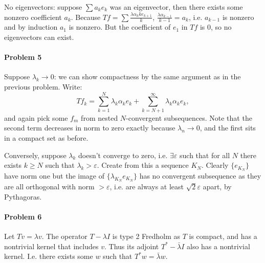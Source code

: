 \documentclass[12pt]{article}
\begin{document}
No eigenvectors: suppose $\sum a_ke_k$ was an eigenvector, then there exists
some nonzero coefficient $a_k$. Because $Tf = \sum \frac{\lambda \alpha_{k}{k}
  e_{k+1}}{k}$, $\frac{\lambda\alpha_{k-1}}{k-1} = a_k$, i.e. $a_{k-1}$ is
nonzero and by induction $a_1$ is nonzero. But the coefficient of $e_1$ in $Tf$
is 0, so no eigenvectors can exist.

\paragraph{Problem 5}

Suppose $\lambda_k \to 0$: we can show compactness by the same argument as in
the previous problem. Write:
\begin{displaymath}
  Tf_k = \sum_{k=1}^N\lambda_k\alpha_ke_k + \sum_{k=N+1}^\infty\lambda_k\alpha_ke_k,
\end{displaymath}
and again pick some $f_m$ from nested $N$-convergent subsequences. Note that
the second term decreases in norm to zero exactly because $\lambda_n\to 0$, and
the first sits in a compact set as before.

Conversely, suppose $\lambda_k$ doesn't converge to zero, i.e. $\exists
\varepsilon$ such that for all $N$ there exists $k \geq N$ such that $\lambda_k
> \varepsilon$. Create from this a sequence $K_N$. Clearly $\{e_{K_N}\}$ have
norm one but the image of $\{\lambda_{K_N}e_{K_N}\}$ has no convergent
subsequence
as they are all orthogonal with norm $> \varepsilon$, i.e. are always at least
$\sqrt{2}\varepsilon$ apart, by Pythagoras.

\paragraph{Problem 6}

Let $Tv = \lambda v$. The operator $T-\lambda I$ is type 2 Fredholm as $T$ is
compact, and has a nontrivial kernel that includes $v$. Thus its adjoint
$T^* - \bar{\lambda}I$ also has a nontrivial kernel. I.e. there exists some
$w$ such that $T^*w = \bar{\lambda}w$.
\end{document}
